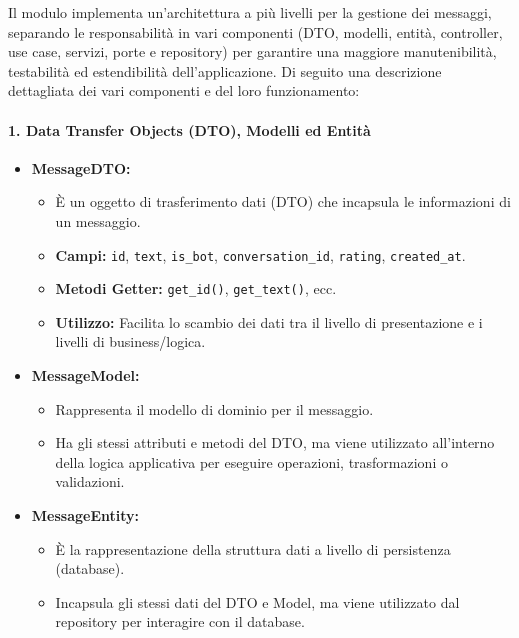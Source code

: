     Il modulo implementa un'architettura a più livelli per la gestione dei messaggi, separando le responsabilità in vari componenti (DTO, modelli, entità, controller, use case, servizi, porte e repository) per garantire una maggiore manutenibilità, testabilità ed estendibilità dell’applicazione. Di seguito una descrizione dettagliata dei vari componenti e del loro funzionamento:

    \paragraph{1. Data Transfer Objects (DTO), Modelli ed Entità}
    \begin{itemize}
        \item \textbf{MessageDTO:}
        \begin{itemize}
            \item È un oggetto di trasferimento dati (DTO) che incapsula le informazioni di un messaggio.
            \item \textbf{Campi:} \texttt{id}, \texttt{text}, \texttt{is\_bot}, \texttt{conversation\_id}, \texttt{rating}, \texttt{created\_at}.
            \item \textbf{Metodi Getter:} \texttt{get\_id()}, \texttt{get\_text()}, ecc.
            \item \textbf{Utilizzo:} Facilita lo scambio dei dati tra il livello di presentazione e i livelli di business/logica.
        \end{itemize}
        \item \textbf{MessageModel:}
        \begin{itemize}
            \item Rappresenta il modello di dominio per il messaggio.
            \item Ha gli stessi attributi e metodi del DTO, ma viene utilizzato all'interno della logica applicativa per eseguire operazioni, trasformazioni o validazioni.
        \end{itemize}
        \item \textbf{MessageEntity:}
        \begin{itemize}
            \item È la rappresentazione della struttura dati a livello di persistenza (database).
            \item Incapsula gli stessi dati del DTO e Model, ma viene utilizzato dal repository per interagire con il database.
        \end{itemize}
    \end{itemize}

